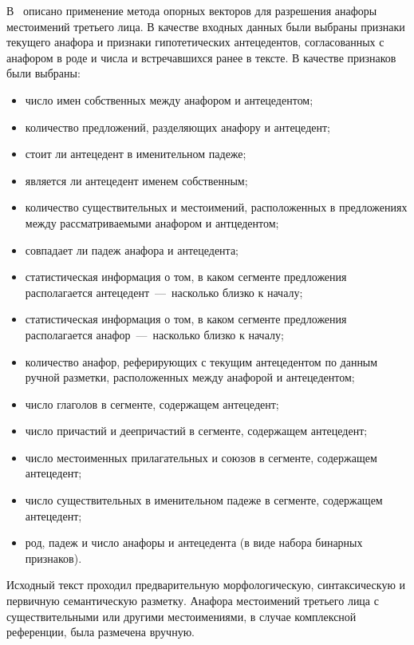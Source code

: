В~\cite{tolpegin2006algorithm} описано применение метода опорных векторов для разрешения анафоры местоимений третьего лица. В качестве входных данных были выбраны признаки текущего анафора и признаки гипотетических антецедентов, согласованных с анафором в роде и числа и встречавшихся ранее в тексте. В качестве признаков были выбраны:
\begin{itemize}
	\item число имен собственных между анафором и антецедентом;
	\item количество предложений, разделяющих анафору и антецедент;
	\item стоит ли антецедент в именительном падеже;
	\item является ли антецедент именем собственным;
	\item количество существительных и местоимений, расположенных в предложениях между рассматриваемыми анафором и антцедентом;
	\item совпадает ли падеж анафора и антецедента;
	\item статистическая информация о том, в каком сегменте предложения располагается антецедент~---~насколько близко к началу;
	\item статистическая информация о том, в каком сегменте предложения располагается анафор~---~насколько близко к началу;
	\item количество анафор, реферирующих с текущим антецедентом по данным ручной разметки, расположенных между анафорой и антецедентом;
	\item число глаголов в сегменте, содержащем антецедент;
	\item число причастий и деепричастий в сегменте, содержащем антецедент;
	\item число местоименных прилагательных и союзов в сегменте, содержащем антецедент;
	\item число существительных в именительном падеже в сегменте, содержащем антецедент;
	\item род, падеж и число анафоры и антецедента (в виде набора бинарных признаков). 
\end{itemize}

Исходный текст проходил предварительную морфологическую, синтаксическую и первичную семантическую разметку. Анафора местоимений третьего лица с существительными или другими местоимениями, в случае комплексной референции, была размечена вручную. 

